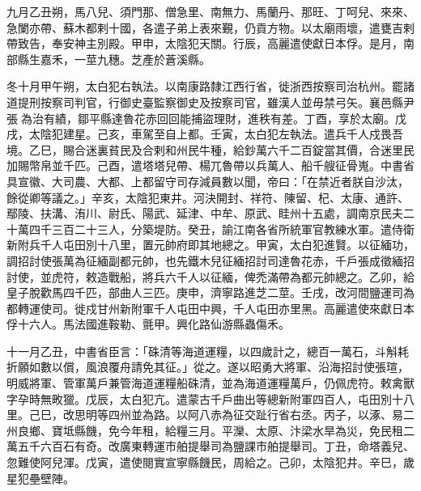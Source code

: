\begin{pinyinscope}
 九月乙丑朔，馬八兒、須門那、僧急里、南無力、馬蘭丹、那旺、丁呵兒、來來、急闌亦帶、蘇木都剌十國，各遣子弟上表來覲，仍貢方物。以太廟雨壞，遣甕吉剌帶致告，奉安神主別殿。甲申，太陰犯天關。行辰，高麗遣使獻日本俘。是月，南部縣生嘉禾，一莖九穗。芝產於蒼溪縣。



 冬十月甲午朔，太白犯右執法。以南康路隸江西行省，徙浙西按察司治杭州。罷諸道提刑按察司判官，行御史臺監察御史及按察司官，雖漢人並毋禁弓矢。襄邑縣尹張為治有績，鄒平縣達魯花赤回回能捕盜理財，進秩有差。丁酉，享於太廟。戊戌，太陰犯建星。己亥，車駕至自上都。壬寅，太白犯左執法。遣兵千人戍畏吾境。乙巳，賜合迷裏貧民及合剌和州民牛種，給鈔萬六千二百錠當其價，合迷里民加賜幣帛並千匹。己酉，遣塔塔兒帶、楊兀魯帶以兵萬人、船千艘征骨嵬。中書省具宣徽、大司農、大都、上都留守司存減員數以聞，帝曰：「在禁近者朕自沙汰，餘從卿等議之。」辛亥，太陰犯東井。河決開封、祥符、陳留、杞、太康、通許、鄢陵、扶溝、洧川、尉氏、陽武、延津、中牟、原武、眭州十五處，調南京民夫二十萬四千三百二十三人，分築堤防。癸丑，諭江南各省所統軍官教練水軍。遣侍衛新附兵千人屯田別十八里，置元帥府即其地總之。甲寅，太白犯進賢。以征緬功，調招討使張萬為征緬副都元帥，也先鐵木兒征緬招討司達魯花赤，千戶張成徵緬招討使，並虎符，敕造戰船，將兵六千人以征緬，俾禿滿帶為都元帥總之。乙卯，給皇子脫歡馬四千匹，部曲人三匹。庚申，濟寧路進芝二莖。壬戌，改河間鹽運司為都轉運使司。徙戍甘州新附軍千人屯田中興，千人屯田亦里黑。高麗遣使來獻日本俘十六人。馬法國進鞍勒、氈甲。興化路仙游縣蟲傷禾。



 十一月乙丑，中書省臣言：「硃清等海道運糧，以四歲計之，總百一萬石，斗斛耗折願如數以償，風浪覆舟請免其征。」從之。遂以昭勇大將軍、沿海招討使張瑄，明威將軍、管軍萬戶兼管海道運糧船硃清，並為海道運糧萬戶，仍佩虎符。敕禽獸字孕時無畋獵。戊辰，太白犯亢。遣蒙古千戶曲出等總新附軍四百人，屯田別十八里。己巳，改思明等四州並為路。以阿八赤為征交趾行省右丞。丙子，以涿、易二州良鄉、寶坻縣饑，免今年租，給糧三月。平灤、太原、汴梁水旱為災，免民租二萬五千六百石有奇。改廣東轉運市舶提舉司為鹽課市舶提舉司。丁丑，命塔義兒、忽難使阿兒渾。戊寅，遣使閱實宣寧縣饑民，周給之。己卯，太陰犯井。辛巳，歲星犯壘壁陣。




\end{pinyinscope}
